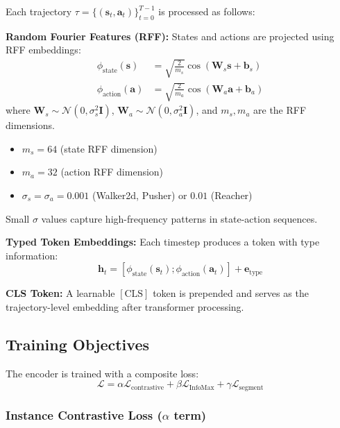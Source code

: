 \documentclass[11pt,a4paper]{article}
\newcommand{\vect}[1]{\mathbf{#1}}
\newcommand{\mat}[1]{\mathbf{#1}}
\begin{document}
Each trajectory $\tau = \{(\vect{s}_t, \vect{a}_t)\}_{t=0}^{T-1}$ is processed as follows:

\textbf{Random Fourier Features (RFF):} States and actions are projected using RFF embeddings:
\begin{align}
    \phi_{\text{state}}(\vect{s}) &= \sqrt{\frac{2}{m_s}} \cos(\mat{W}_s \vect{s} + \vect{b}_s) \\
    \phi_{\text{action}}(\vect{a}) &= \sqrt{\frac{2}{m_a}} \cos(\mat{W}_a \vect{a} + \vect{b}_a)
\end{align}
where $\mat{W}_s \sim \mathcal{N}(0, \sigma_s^2 \mat{I})$, $\mat{W}_a \sim \mathcal{N}(0, \sigma_a^2 \mat{I})$, and $m_s, m_a$ are the RFF dimensions.

\begin{tcolorbox}[colback=blue!5,colframe=blue!40!black,title=RFF Hyperparameters]
\begin{itemize}
    \item $m_s = 64$ (state RFF dimension)
    \item $m_a = 32$ (action RFF dimension)
    \item $\sigma_s = \sigma_a = 0.001$ (Walker2d, Pusher) or $0.01$ (Reacher)
\end{itemize}
Small $\sigma$ values capture high-frequency patterns in state-action sequences.
\end{tcolorbox}

\textbf{Typed Token Embeddings:} Each timestep produces a token with type information:
\begin{equation}
    \vect{h}_t = [\phi_{\text{state}}(\vect{s}_t); \phi_{\text{action}}(\vect{a}_t)] + \vect{e}_{\text{type}}
\end{equation}

\textbf{CLS Token:} A learnable $[\text{CLS}]$ token is prepended and serves as the trajectory-level embedding after transformer processing.

\subsection{Training Objectives}

The encoder is trained with a composite loss:
\begin{equation}
    \mathcal{L} = \alpha \mathcal{L}_{\text{contrastive}} + \beta \mathcal{L}_{\text{InfoMax}} + \gamma \mathcal{L}_{\text{segment}}
\end{equation}

\subsubsection{Instance Contrastive Loss ($\alpha$ term)}
\end{document}
